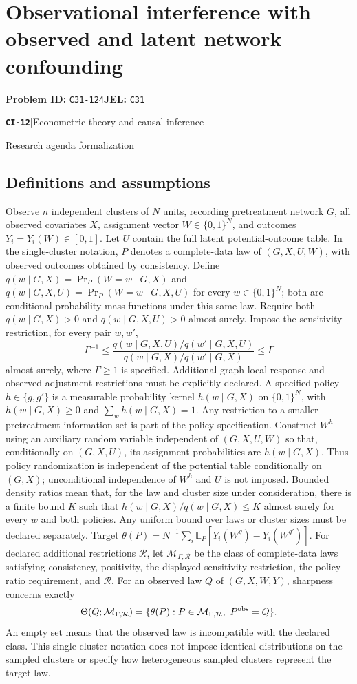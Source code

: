 \documentclass[11pt,a4paper]{article}
\newcommand{\E}{\mathbb E}
\newcommand{\entrymeta}[3]{{\sffamily\small\color{muted}\textbf{\texttt{#1}}\quad|\quad #2\par #3\par}}
\begin{document}
\section*{Observational interference with observed and latent network confounding}
\textbf{Problem ID:} \texttt{C31-124}\quad \textbf{JEL:} \texttt{C31}\par
\label{problem:OP-0491}
\label{beyond:CI-12}
\entrymeta{CI-12}{Econometric theory and causal inference}{Research agenda formalization}
\subsection*{Definitions and assumptions}
Observe $n$ independent clusters of $N$ units, recording pretreatment network $G$, all observed covariates $X$, assignment vector $W\in\{0,1\}^N$, and outcomes $Y_i=Y_i(W)\in[0,1]$. Let $U$ contain the full latent potential-outcome table. In the single-cluster notation, $P$ denotes a complete-data law of $(G,X,U,W)$, with observed outcomes obtained by consistency. Define $q(w\mid G,X)=\Pr_P(W=w\mid G,X)$ and $q(w\mid G,X,U)=\Pr_P(W=w\mid G,X,U)$ for every $w\in\{0,1\}^N$; both are conditional probability mass functions under this same law. Require both $q(w\mid G,X)>0$ and $q(w\mid G,X,U)>0$ almost surely. Impose the sensitivity restriction, for every pair $w,w'$,
\[
\Gamma^{-1}\leq
\frac{q(w\mid G,X,U)/q(w'\mid G,X,U)}
     {q(w\mid G,X)/q(w'\mid G,X)}
\leq\Gamma
\]
almost surely, where $\Gamma\geq1$ is specified. Additional graph-local response and observed adjustment restrictions must be explicitly declared. A specified policy $h\in\{g,g'\}$ is a measurable probability kernel $h(w\mid G,X)$ on $\{0,1\}^N$, with $h(w\mid G,X)\geq0$ and $\sum_w h(w\mid G,X)=1$. Any restriction to a smaller pretreatment information set is part of the policy specification. Construct $W^h$ using an auxiliary random variable independent of $(G,X,U,W)$ so that, conditionally on $(G,X,U)$, its assignment probabilities are $h(w\mid G,X)$. Thus policy randomization is independent of the potential table conditionally on $(G,X)$; unconditional independence of $W^h$ and $U$ is not imposed. Bounded density ratios mean that, for the law and cluster size under consideration, there is a finite bound $K$ such that $h(w\mid G,X)/q(w\mid G,X)\leq K$ almost surely for every $w$ and both policies. Any uniform bound over laws or cluster sizes must be declared separately. Target
$\theta(P)=N^{-1}\sum_i\E_P[Y_i(W^g)-Y_i(W^{g'})]$.
For declared additional restrictions $\mathcal R$, let $\mathcal M_{\Gamma,\mathcal R}$ be the class of complete-data laws satisfying consistency, positivity, the displayed sensitivity restriction, the policy-ratio requirement, and $\mathcal R$. For an observed law $Q$ of $(G,X,W,Y)$, sharpness concerns exactly
\[
 \Theta(Q;\mathcal M_{\Gamma,\mathcal R})
 =\{\theta(P):P\in\mathcal M_{\Gamma,\mathcal R},\ P^{\rm obs}=Q\}.
\]
An empty set means that the observed law is incompatible with the declared class. This single-cluster notation does not impose identical distributions on the sampled clusters or specify how heterogeneous sampled clusters represent the target law.
\end{document}
